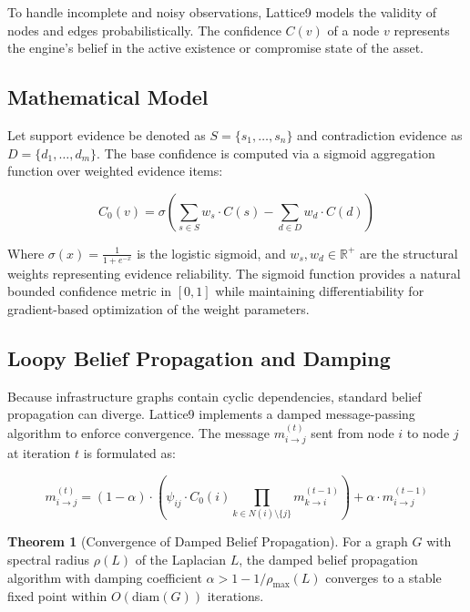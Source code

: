 \documentclass[11pt,a4paper]{article}
\theoremstyle{definition}
\newtheorem{theorem}{Theorem}[section]
\numberwithin{equation}{section}
\newcommand{\R}{\mathbb{R}}
\begin{document}
To handle incomplete and noisy observations, Lattice9 models the validity of nodes and edges probabilistically. The confidence $C(v)$ of a node $v$ represents the engine's belief in the active existence or compromise state of the asset.

\subsection{Mathematical Model}\label{subsec:bayesian-model}

Let support evidence be denoted as $S = \{s_1, \dots, s_n\}$ and contradiction evidence as $D = \{d_1, \dots, d_m\}$. The base confidence is computed via a sigmoid aggregation function over weighted evidence items:

\begin{equation}\label{eq:base-confidence}
C_0(v) = \sigma \left( \sum_{s \in S} w_s \cdot C(s) - \sum_{d \in D} w_d \cdot C(d) \right)
\end{equation}

Where $\sigma(x) = \frac{1}{1 + e^{-x}}$ is the logistic sigmoid, and $w_s, w_d \in \R^+$ are the structural weights representing evidence reliability. The sigmoid function provides a natural bounded confidence metric in $[0, 1]$ while maintaining differentiability for gradient-based optimization of the weight parameters.

\subsection{Loopy Belief Propagation and Damping}\label{subsec:loopy-bp}

Because infrastructure graphs contain cyclic dependencies, standard belief propagation can diverge. Lattice9 implements a damped message-passing algorithm to enforce convergence. The message $m_{i \to j}^{(t)}$ sent from node $i$ to node $j$ at iteration $t$ is formulated as:

\begin{equation}\label{eq:loopy-bp}
m_{i \to j}^{(t)} = (1 - \alpha) \cdot \left( \psi_{ij} \cdot C_0(i) \prod_{k \in N(i) \setminus \{j\}} m_{k \to i}^{(t-1)} \right) + \alpha \cdot m_{i \to j}^{(t-1)}
\end{equation}

\begin{theorem}[Convergence of Damped Belief Propagation]\label{thm:bp-convergence}
For a graph $G$ with spectral radius $\rho(L)$ of the Laplacian $L$, the damped belief propagation algorithm with damping coefficient $\alpha > 1 - 1/\rho_{\max}(L)$ converges to a stable fixed point within $O(\text{diam}(G))$ iterations.
\end{theorem}
\end{document}
